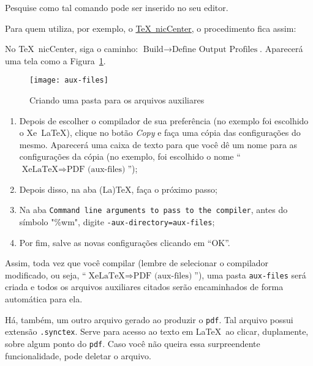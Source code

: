 Pesquise como tal comando pode ser inserido no seu editor.

Para quem utiliza, por exemplo, o 
\href{https://www.texniccenter.org/}{\TeX~nicCenter}, o procedimento fica assim:

No \TeX~nicCenter, siga o caminho: 
$\text{Build} \longrightarrow \text{Define Output Profiles}$. 
Aparecerá uma tela como a Figura~\ref{fig:aux-files}.

\begin{figure}[!htb]
 \centering
 \texttt{[image: aux-files]}%
 \caption{Criando uma pasta para os arquivos auxiliares}%
 \label{fig:aux-files}%
\end{figure}

\begin{enumerate}
	\item Depois de escolher o compilador de sua preferência (no exemplo foi 
  escolhido o Xe~\LaTeX), clique no botão \textit{Copy} e faça uma cópia das 
  configurações do mesmo.
  Aparecerá uma caixa de texto para que você dê um nome para as configurações 
  da cópia (no exemplo, foi escolhido o nome
  ``$ \text{XeLaTeX} \Rightarrow \text{PDF } \text{(aux-files)}$'');
 \item Depois disso, na aba (La)TeX, faça o próximo passo;
 \item Na aba \texttt{Command line arguments to pass to the compiler}, antes do
  símbolo "\%wm", digite \texttt{-aux-directory=aux-files};
 \item Por fim, salve as novas configurações clicando em ``OK''.
\end{enumerate}

Assim, toda vez que você compilar (lembre de selecionar o compilador modificado,
ou seja, ``$ \text{XeLaTeX} \Rightarrow \text{PDF } \text{(aux-files)}$''), uma 
pasta \texttt{aux-files} será criada e todos os arquivos auxiliares citados 
serão encaminhados de forma automática para ela.

Há, também, um outro arquivo gerado ao produzir o \texttt{pdf}.
Tal arquivo possui extensão \texttt{.synctex}.
Serve para acesso ao texto em \LaTeX\ ao clicar, duplamente, sobre algum ponto
do \texttt{pdf}.
Caso você não queira essa surpreendente funcionalidade, pode deletar o arquivo.
